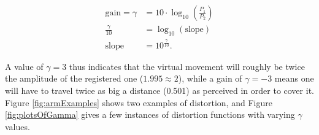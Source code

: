 \begin{align*}
    \text{gain} = \gamma &= 10 \cdot \log_{10} (\frac{P_1}{P_2})\\
    \frac{\gamma}{10} &= \log_{10} (\text{slope})\\
    \text{slope} &= 10^{\frac{\gamma}{10}}.
\end{align*}

A value of $\gamma = 3$ thus indicates that the virtual movement will roughly be twice the amplitude of the registered one ($1.995 \approx 2$), while a gain of $\gamma = -3$ means one will have to travel twice as big a distance (\num{0.501}) as perceived in order to cover it. Figure \ref{fig:armExamples} shows two examples of distortion, and Figure \ref{fig:plotsOfGamma} gives a few instances of distortion functions with varying $\gamma $ values.

